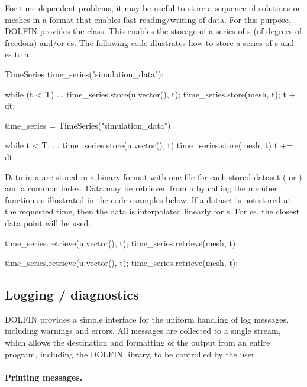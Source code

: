 For time-dependent problems, it may be useful to store a
sequence of solutions or meshes in a format that enables fast
reading/writing of data. For this purpose, DOLFIN provides the
 class. This enables the storage of a series of
s (of degrees of freedom) and/or es. The
following code illustrates how to store a series of s and
es to a :
\begin{c++}
TimeSeries time_series("simulation_data");

while (t < T)
{
  ...
  time_series.store(u.vector(), t);
  time_series.store(mesh, t);
  t += dt;
}
\end{c++}
\begin{python}
time_series = TimeSeries("simulation_data")

while t < T:
    ...
    time_series.store(u.vector(), t)
    time_series.store(mesh, t)
    t += dt
\end{python}
Data in a  are stored in a binary format with one
file for each stored dataset ( or ) and a common
index. Data may be retrieved from a  by calling the
 member function as illustrated in the code examples
below. If a dataset is not stored at the requested time, then the data
is interpolated linearly for s. For es, the
closest data point will be used.
\begin{c++}
time_series.retrieve(u.vector(), t);
time_series.retrieve(mesh, t);
\end{c++}
\begin{python}
time_series.retrieve(u.vector(), t);
time_series.retrieve(mesh, t);
\end{python}

\subsection{Logging / diagnostics}

DOLFIN provides a simple interface for the uniform handling of log
messages, including warnings and errors. All messages are collected to a
single stream, which allows the destination and formatting of the output
from an entire program, including the DOLFIN library, to be controlled
by the user.

\paragraph{Printing messages.}

